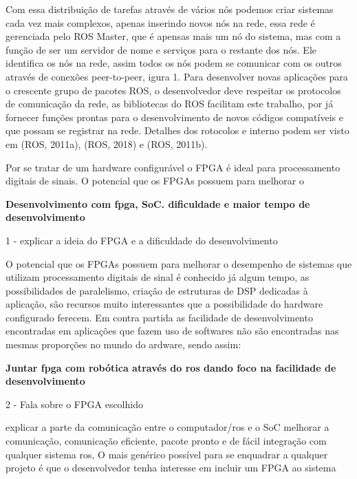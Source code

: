Com essa distribuição de tarefas através de vários nós podemos criar sistemas cada
vez mais complexos, apenas inserindo novos nós na rede, essa rede é gerenciada pelo ROS Master, que é apensas mais um nó do sistema, mas com a função de ser um servidor de nome e serviços para o restante dos nós. Ele identifica os nós na rede, assim todos os nós podem se comunicar com os outros através de conexões peer-to-peer, igura
1. Para desenvolver novas aplicações para o crescente grupo de pacotes ROS, o desenvolvedor deve respeitar os protocolos de comunicação da rede, as bibliotecas do ROS facilitam este trabalho, por já fornecer funções prontas para o desenvolvimento
de novos códigos compatíveis e que possam se registrar na rede. Detalhes dos  rotocolos e interno podem ser visto em (ROS, 2011a), (ROS, 2018) e (ROS, 2011b).

Por se tratar de um hardware configurável o FPGA é ideal para processamento digitais de sinais. O potencial que os FPGAs possuem para melhorar o 

\textbf{Desenvolvimento com fpga, SoC. dificuldade e maior tempo de desenvolvimento}

1 - explicar a ideia do FPGA e a dificuldade do desenvolvimento

 O potencial que os FPGAs possuem para melhorar o desempenho de sistemas que utilizam processamento digitais de sinal é conhecido já algum tempo, as possibilidades de paralelismo, criação de estruturas de DSP dedicadas à aplicação,
são recursos muito interessantes que a possibilidade do hardware configurado ferecem.
Em contra partida as facilidade de desenvolvimento encontradas em aplicações que fazem uso de softwares não são encontradas nas mesmas proporções no mundo do ardware,
sendo assim:

\textbf{Juntar fpga com robótica através do ros dando foco na facilidade de desenvolvimento}

2 - Fala sobre o FPGA escolhido

explicar a parte da comunicação entre o computador/ros e o SoC melhorar a comunicação, comunicação eficiente, pacote pronto e de fácil integração com qualquer sistema ros, O mais genérico possível para se enquadrar a qualquer projeto é que o desenvolvedor tenha interesse em incluir um FPGA ao sistema



